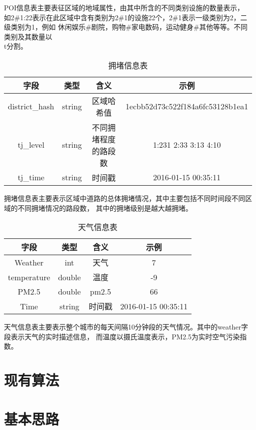 \documentclass[hyperref,UTF8]{ctexart}
\theoremstyle{definition}
\theoremstyle{remark}
\numberwithin{equation}{subsection}
\begin{document}
	POI信息表主要表征区域的地域属性，由其中所含的不同类别设施的数量表示，
如2\#1:22表示在此区域中含有类别为2\#1的设施22个，2\#1表示一级类别为2，二级类别为1，例如
休闲娱乐\#剧院，购物\#家电数码，运动健身\#其他等等。不同类别及其数量以\\t分割。
	
	\begin{table}[H]
    \centering
	\caption{拥堵信息表}
	\begin{tabular}{|c|c|c|c|}
	\hline
	字段	&	类型	&	含义	&	示例		\\
	\hline
	district\_hash & string & 区域哈希值 & 1ecbb52d73c522f184a6fc53128b1ea1		\\
	tj\_level & string & 不同拥堵程度的路段数 & 1:231 2:33 3:13 4:10			\\
	tj\_time & string & 时间戳 & 2016-01-15 00:35:11							\\
	\hline
	\end{tabular}
	\end{table}
	
	拥堵信息表主要表示区域中道路的总体拥堵情况，其中主要包括不同时间段不同区域的不同拥堵情况的路段数，
其中的拥堵级别是越大越拥堵。

	\begin{table}[H]
    \centering
	\caption{天气信息表}
	\begin{tabular}{|c|c|c|c|}
	\hline
	字段	&	类型	&	含义	&	示例		\\
	\hline
	Weather & int & 天气 & 7	\\
	temperature & double & 温度 & -9	\\
	PM2.5 & double & pm2.5 & 66	\\
	Time & string & 时间戳 & 2016-01-15 00:35:11	\\
	\hline
	\end{tabular}
	\end{table}
	
	天气信息表主要表示整个城市的每天间隔10分钟段的天气情况。其中的weather字段表示天气的实时描述信息，
而温度以摄氏温度表示，PM2.5为实时空气污染指数。


\section{现有算法}
\label{sec:current_algo}



\section{基本思路}
\label{sec:basic_thought}
	
	
	
\end{document}

